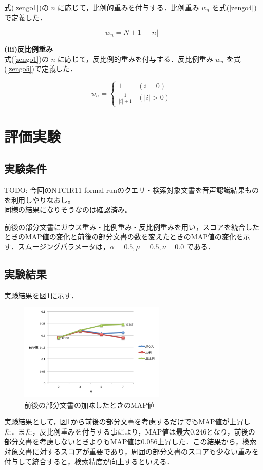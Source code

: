 式(\ref{zengo1})の $n$ に応じて，比例的重みを付与する．比例重み $w_n$ を式(\ref{zengo4})で定義した．

\begin{equation}
    w_n = N+1-|n|
    \label{zengo4}
\end{equation}

{\bf(iii)反比例重み} \\

式(\ref{zengo1})の $n$ に応じて，反比例的重みを付与する．反比例重み $w_n$ を式(\ref{zengo5})で定義した．

\begin{equation}
    w_n = 
    \begin{cases} 
        1 & (i = 0)\\ 
        \frac{1}{|i|+1} & (|i| > 0)
    \end{cases} 
    \label{zengo5}
\end{equation}

\section{評価実験}
\subsection{実験条件}

{\Large TODO: 今回のNTCIR11 formal-runのクエリ・検索対象文書を音声認識結果ものを利用しやりなおし。 \\
同様の結果になりそうなのは確認済み。}

前後の部分文書にガウス重み・比例重み・反比例重みを用い，スコアを統合したときのMAP値の変化と前後の部分文書の数を変えたときのMAP値の変化を示す．スムージングパラメータは，$\alpha= 0.5, \mu= 0.5, \nu= 0.0$ である．

\subsection{実験結果}
実験結果を図\ref{web_result1}に示す．

\begin{figure}[htbp]
    \centering
    \includegraphics[width=7cm]{./image/zengo.png}
    \caption{前後の部分文書の加味したときのMAP値}
    \label{web_result1}
\end{figure}

実験結果として，図\ref{web_result1}から前後の部分文書を考慮するだけでもMAP値が上昇した．また，反比例重みを付与する事により，MAP値は最大0.246となり，前後の部分文書を考慮しないときよりもMAP値は0.056上昇した．この結果から，検索対象文書に対するスコアが重要であり，周囲の部分文書のスコアも少ない重みを付与して統合すると，検索精度が向上するといえる．

